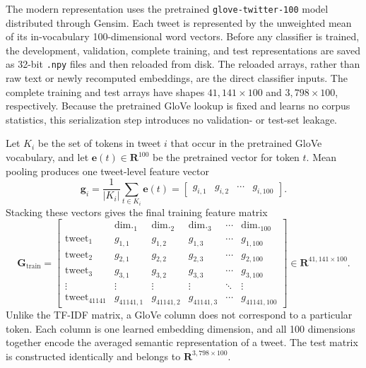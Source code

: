 The modern representation uses the pretrained \texttt{glove-twitter-100} model distributed 
through Gensim. Each tweet is represented by the unweighted mean of its in-vocabulary 
100-dimensional word vectors. Before any classifier is trained, the development, validation,
complete training, and test representations are saved as 32-bit \texttt{.npy} files and then
reloaded from disk. The reloaded arrays, rather than raw text or newly recomputed embeddings,
are the direct classifier inputs. The complete training and test arrays have shapes
$41{,}141 \times 100$ and $3{,}798 \times 100$, respectively. Because the pretrained GloVe
lookup is fixed and learns no corpus statistics, this serialization step introduces no
validation- or test-set leakage.

Let $K_i$ be the set of tokens in tweet $i$ that occur in the pretrained GloVe
vocabulary, and let $\mathbf{e}(t)\in\mathbf{R}^{100}$ be the pretrained vector
for token $t$. Mean pooling produces one tweet-level feature vector
\[
\mathbf{g}_i=\frac{1}{|K_i|}\sum_{t\in K_i}\mathbf{e}(t)
             =\begin{bmatrix}g_{i,1}&g_{i,2}&\cdots&g_{i,100}\end{bmatrix}.
\]
Stacking these vectors gives the final training feature matrix
\[
\mathbf{G}_{\mathrm{train}}=
\left[
\begin{array}{c|ccccc}
 & \text{dim.}_{1} & \text{dim.}_{2} & \text{dim.}_{3}
 & \cdots & \text{dim.}_{100} \\
\hline
\text{tweet}_{1}      & g_{1,1}      & g_{1,2}      & g_{1,3}      & \cdots & g_{1,100} \\
\text{tweet}_{2}      & g_{2,1}      & g_{2,2}      & g_{2,3}      & \cdots & g_{2,100} \\
\text{tweet}_{3}      & g_{3,1}      & g_{3,2}      & g_{3,3}      & \cdots & g_{3,100} \\
\vdots                & \vdots       & \vdots       & \vdots       & \ddots & \vdots \\
\text{tweet}_{41141} & g_{41141,1} & g_{41141,2} & g_{41141,3}
                         & \cdots & g_{41141,100}
\end{array}
\right]
\in\mathbf{R}^{41{,}141\times100}.
\]
Unlike the TF-IDF matrix, a GloVe column does not correspond to a particular
token. Each column is one learned embedding dimension, and all 100 dimensions
together encode the averaged semantic representation of a tweet. The test
matrix is constructed identically and belongs to
$\mathbf{R}^{3{,}798\times100}$.

